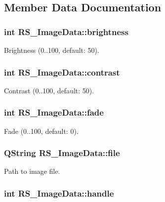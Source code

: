 \subsection{Member Data Documentation}
\hypertarget{classRS__ImageData_a6aeb92c7c3cc0307bbab71df1aca35cd}{
\subsubsection[{brightness}]{\setlength{\rightskip}{0pt plus 5cm}int R\-S\-\_\-\-Image\-Data\-::brightness}}\label{classRS__ImageData_a6aeb92c7c3cc0307bbab71df1aca35cd}
Brightness (0..100, default\-: 50). \hypertarget{classRS__ImageData_ac89ef574dc340a20662bbb8829eb0ba3}{
\subsubsection[{contrast}]{\setlength{\rightskip}{0pt plus 5cm}int R\-S\-\_\-\-Image\-Data\-::contrast}}\label{classRS__ImageData_ac89ef574dc340a20662bbb8829eb0ba3}
Contrast (0..100, default\-: 50). \hypertarget{classRS__ImageData_afa168ba63f68678c24f14bcb10ef5b51}{
\subsubsection[{fade}]{\setlength{\rightskip}{0pt plus 5cm}int R\-S\-\_\-\-Image\-Data\-::fade}}\label{classRS__ImageData_afa168ba63f68678c24f14bcb10ef5b51}
Fade (0..100, default\-: 0). \hypertarget{classRS__ImageData_ab1e8cbf7bddf033267c25ce18b90222b}{
\subsubsection[{file}]{\setlength{\rightskip}{0pt plus 5cm}Q\-String R\-S\-\_\-\-Image\-Data\-::file}}\label{classRS__ImageData_ab1e8cbf7bddf033267c25ce18b90222b}
Path to image file. \hypertarget{classRS__ImageData_a28c803b859c0de2d6f34ba28f54883aa}{
\subsubsection[{handle}]{\setlength{\rightskip}{0pt plus 5cm}int R\-S\-\_\-\-Image\-Data\-::handle}}\label{classRS__ImageData_a28c803b859c0de2d6f34ba28f54883aa}
